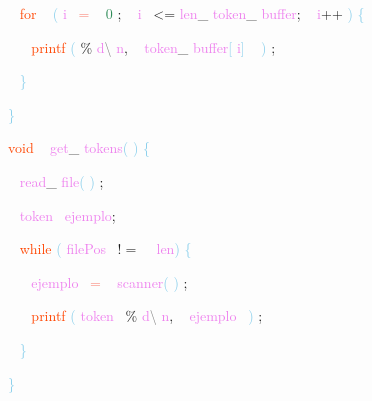 \documentclass[8, usernames, dvipsnames]{beamer}
\begin{document}
\begin{frame}
\textcolor{White}{\   }
\textcolor{OrangeRed}{for}
\textcolor{White}{\ }
\textcolor{SkyBlue}{(}
\textcolor{Violet}{i}\textcolor{White}{\ }
\textcolor{Salmon}{=}
\textcolor{White}{\ }
\textcolor{SeaGreen}{0}
\textcolor{Sepia}{;}
\textcolor{White}{\ }
\textcolor{Violet}{i}\textcolor{White}{\ }
\textcolor{OliveGreen}{\textless =}
\textcolor{Violet}{len}\textcolor{Sepia}{\_}
\textcolor{Violet}{token}\textcolor{Sepia}{\_}
\textcolor{Violet}{buffer}\textcolor{Sepia}{;}
\textcolor{White}{\ }
\textcolor{Violet}{i}\textcolor{Apricot}{++}
\textcolor{SkyBlue}{)}
\textcolor{SkyBlue}{\{ }

 \textcolor{White}{\   }
\textcolor{White}{\   }
\textcolor{OrangeRed}{printf}
\textcolor{SkyBlue}{(}
\textcolor{Apricot}{\%}
\textcolor{Violet}{d}\textcolor{Gray}{\textbackslash }
\textcolor{Violet}{n}\textcolor{Sepia}{,}
\textcolor{White}{\ }
\textcolor{Violet}{token}\textcolor{Sepia}{\_}
\textcolor{Violet}{buffer}\textcolor{SkyBlue}{[}
\textcolor{Violet}{i}\textcolor{SkyBlue}{]}
\textcolor{White}{\ }
\textcolor{SkyBlue}{)}
\textcolor{Sepia}{;}

 \textcolor{White}{\   }
\textcolor{SkyBlue}{\} }

 \textcolor{SkyBlue}{\} }

 
 \textcolor{OrangeRed}{void}
\textcolor{White}{\ }
\textcolor{Violet}{get}\textcolor{Sepia}{\_}
\textcolor{Violet}{tokens}\textcolor{SkyBlue}{(}
\textcolor{SkyBlue}{)}
\textcolor{SkyBlue}{\{ }

 \textcolor{White}{\   }
\textcolor{Violet}{read}\textcolor{Sepia}{\_}
\textcolor{Violet}{file}\textcolor{SkyBlue}{(}
\textcolor{SkyBlue}{)}
\textcolor{Sepia}{;}

 \textcolor{White}{\   }
\textcolor{Violet}{token}\textcolor{White}{\ }
\textcolor{Violet}{ejemplo}\textcolor{Sepia}{;}

 \textcolor{White}{\   }
\textcolor{OrangeRed}{while}
\textcolor{SkyBlue}{(}
\textcolor{Violet}{filePos}\textcolor{White}{\ }
\textcolor{OliveGreen}{$!=$}
\textcolor{White}{\ }
\textcolor{Violet}{len}\textcolor{SkyBlue}{)}
\textcolor{SkyBlue}{\{ }

 \textcolor{White}{\   }
\textcolor{White}{\   }
\textcolor{Violet}{ejemplo}\textcolor{White}{\ }
\textcolor{Salmon}{=}
\textcolor{White}{\ }
\textcolor{Violet}{scanner}\textcolor{SkyBlue}{(}
\textcolor{SkyBlue}{)}
\textcolor{Sepia}{;}

 \end{frame}
\begin{frame}
\textcolor{White}{\   }
\textcolor{White}{\   }
\textcolor{OrangeRed}{printf}
\textcolor{SkyBlue}{(}
\textcolor{Violet}{token}\textcolor{White}{\ }
\textcolor{Apricot}{\%}
\textcolor{Violet}{d}\textcolor{Gray}{\textbackslash }
\textcolor{Violet}{n}\textcolor{Sepia}{,}
\textcolor{White}{\ }
\textcolor{Violet}{ejemplo}\textcolor{White}{\ }
\textcolor{SkyBlue}{)}
\textcolor{Sepia}{;}

 \textcolor{White}{\   }
\textcolor{SkyBlue}{\} }

 
 \textcolor{SkyBlue}{\} }

 \end{frame}
\end{document}
